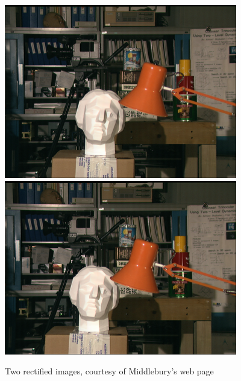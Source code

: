 \documentclass[a4paper, titlepage,12pt]{article}
\begin{document}
	\begin{figure}[H]
		\begin{center}
			\includegraphics[scale=0.5]{./scene1.row3.col3.png}
			\includegraphics[scale=0.5]{./scene1.row3.col4.png}
			\caption{Two rectified images, courtesy of Middlebury's web page}
		\end{center}
	\end{figure}
\end{document}
